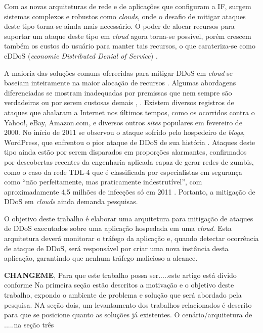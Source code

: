 Com as novas arquiteturas de rede e de aplicações que configuram a IF, surgem sistemas complexos e robustos como \emph{clouds}, onde o desafio de mitigar ataques deste tipo torna-se ainda mais necessário.  O poder de
alocar recursos para suportar um ataque deste tipo em \emph{cloud}  agora torna-se
possível, porém crescem também os custos do usuário para manter tais recursos, o que
carateriza-se como eDDoS (\emph{economic Distributed Denial of Service}) \cite{Soon:10}.
  
A maioria das soluções comuns oferecidas para mitigar DDoS em \emph{cloud} se baseiam inteiramente na maior alocação de
recursos \cite{Peng:2007:SND:1216370.1216373}. 
%
Algumas abordagens diferenciadas se mostram inadequadas por premissas que nem sempre são verdadeiras ou por serem custosas demais \cite{Bakshi:10}, \cite{Liu:2010:NFD:1866835.1866849}.
Existem diversos registros de ataques que abalaram a Internet nos últimos tempos, como os ocorridos contra o Yahoo!, eBay, Amazon.com, e diversos outros \emph{sites} populares em fevereiro de 2000.  No início de 2011 se observou o ataque sofrido pelo hospedeiro de \emph{blogs}, WordPress, que enfrentou o pior ataque de DDoS de sua história \cite{infoexame}. Ataques deste tipo ainda estão por serem disparados em proporções alarmantes, confirmados por descobertas recentes da engenharia aplicada capaz de gerar redes de zumbis, como o caso da rede TDL-4 que é classificada por especialistas em segurança como “não perfeitamente, mas praticamente indestrutível”, com aproximadamente 4,5 milhões de infecções só em 2011 \cite{tdl4}. Portanto, a mitigação de DDoS em \emph{clouds} ainda demanda pesquisas.

O objetivo deste trabalho é elaborar uma arquitetura para mitigação de ataques de
DDoS executados sobre uma aplicação hospedada em uma \emph{cloud}. Esta
arquitetura deverá monitorar o tráfego da aplicação e, quando
detectar ocorrência de ataque de DDoS, será responsável por criar uma nova
instância desta aplicação, garantindo que nenhum tráfego malicioso a alcance. 

\textbf{CHANGEME},
Para que este trabalho possa ser.....este artigo está divido conforme 
Na primeira seção estão descritos a motivação e o objetivo deste trabalho, expondo o ambiente de problema e solução que será abordado pela pesquisa. NA seção dois, um levantamento dos trabalhos relacionados é descrito para que se posicione quanto as soluções já existentes. O cenário/arquitetura de .....na seção três

%
%
